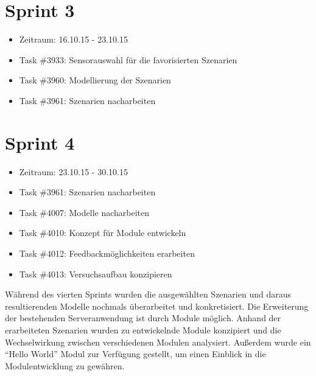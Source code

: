 \documentclass[12pt, oneside, smallheadings]{scrbook}
\begin{document}
\section{Sprint 3}
\begin{itemize}
	\item Zeitraum: 16.10.15 - 23.10.15
	\item Task \#3933: Sensorauswahl für die favorisierten Szenarien
	\item Task \#3960: Modellierung der Szenarien
	\item Task \#3961: Szenarien nacharbeiten
\end{itemize}

\section{Sprint 4}
\begin{itemize}
	\item Zeitraum: 23.10.15 - 30.10.15
	\item Task \#3961: Szenarien nacharbeiten
	\item Task \#4007: Modelle nacharbeiten
	\item Task \#4010: Konzept für Module entwickeln
	\item Task \#4012: Feedbackmöglichkeiten erarbeiten
	\item Task \#4013: Versuchsaufbau konzipieren
\end{itemize}

Während des vierten Sprints wurden die ausgewählten Szenarien und daraus resultierenden Modelle nochmals überarbeitet und konkretisiert. 
Die Erweiterung der bestehenden Serveranwendung ist durch Module möglich. Anhand der erarbeiteten Szenarien wurden zu entwickelnde Module konzipiert und die Wechselwirkung zwischen verschiedenen Modulen analysiert. Außerdem wurde ein "`Hello World"' Modul zur Verfügung gestellt, um einen Einblick in die Modulentwicklung zu gewähren.
\end{document}
